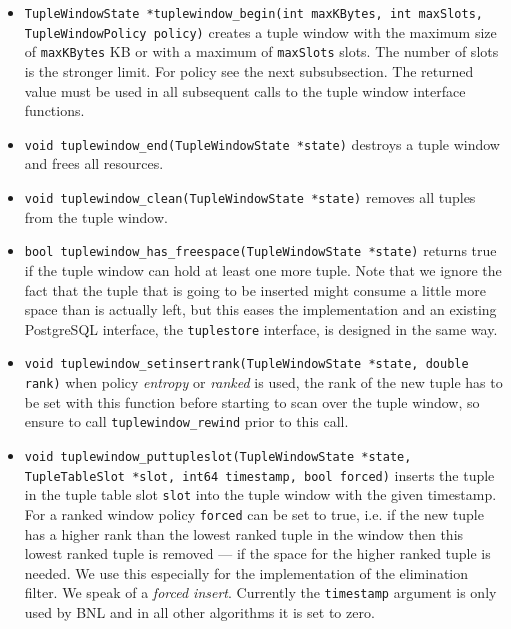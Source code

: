 \begin{itemize}
\item \lstinline|TupleWindowState *tuplewindow_begin(int maxKBytes, int maxSlots, TupleWindowPolicy policy)|
creates a tuple window with the maximum size of \lstinline|maxKBytes|
KB or with a maximum of \lstinline|maxSlots| slots. The number of
slots is the stronger limit. For policy see the
next subsubsection.  The returned value must be
used in all subsequent calls to the tuple window interface functions.

\item \lstinline|void tuplewindow_end(TupleWindowState *state)| 
destroys a tuple window and frees all resources.

\item \lstinline|void tuplewindow_clean(TupleWindowState *state)|
removes all tuples from the tuple window.

\item \lstinline|bool tuplewindow_has_freespace(TupleWindowState *state)|
returns true if the tuple window can hold at least one more tuple.
Note that we ignore the fact that the tuple that is going to be
inserted might consume a little more space than is actually left, but
this eases the implementation and an existing PostgreSQL interface, the
\lstinline|tuplestore| interface, is designed in the same way.

\item \lstinline|void tuplewindow_setinsertrank(TupleWindowState *state, double rank)|
when policy \emph{entropy} or \emph{ranked} is used, the rank of the
new tuple has to be set with this function before starting to scan
over the tuple window, so ensure to call
\lstinline|tuplewindow_rewind| prior to this call.

\item \lstinline|void tuplewindow_puttupleslot(TupleWindowState *state, TupleTableSlot *slot, int64 timestamp, bool forced)|
inserts the tuple in the tuple table slot \lstinline|slot| into the
tuple window with the given timestamp.  For a ranked window policy
\lstinline|forced| can be set to true, i.e. if the new tuple has a
higher rank than the lowest ranked tuple in the window then this
lowest ranked tuple is removed --- if the space for the higher ranked
tuple is needed.  We use this especially for the implementation of the
elimination filter. We speak of a \emph{forced insert}.  Currently the \lstinline|timestamp| argument is only used
by BNL and in all other algorithms it is set to zero.


\end{itemize}
